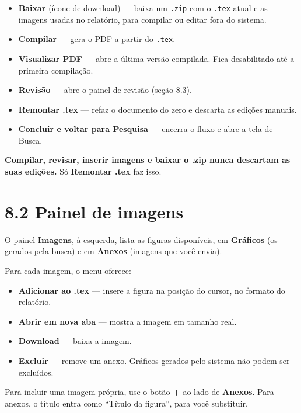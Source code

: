 \documentclass[
  brazilian,
  a4paper,12pt,oneside]{report}
\providecommand{\tightlist}{%
  \setlength{\itemsep}{0pt}\setlength{\parskip}{0pt}}
\begin{document}
\begin{itemize}
\tightlist
\item
  \textbf{Baixar} (ícone de download) --- baixa um
  \texttt{.}\allowbreak{}\texttt{zip} com o
  \texttt{.}\allowbreak{}\texttt{tex} atual e as imagens usadas no
  relatório, para compilar ou editar fora do sistema.
\item
  \textbf{Compilar} --- gera o PDF a partir do
  \texttt{.}\allowbreak{}\texttt{tex}.
\item
  \textbf{Visualizar PDF} --- abre a última versão compilada. Fica
  desabilitado até a primeira compilação.
\item
  \textbf{Revisão} --- abre o painel de revisão (seção 8.3).
\item
  \textbf{Remontar .tex} --- refaz o documento do zero e descarta as
  edições manuais.
\item
  \textbf{Concluir e voltar para Pesquisa} --- encerra o fluxo e abre a
  tela de Busca.
\end{itemize}

\textbf{Compilar, revisar, inserir imagens e baixar o .zip nunca
descartam as suas edições.} Só \textbf{Remontar .tex} faz isso.

\section{8.2 Painel de imagens}\label{painel-de-imagens}

O painel \textbf{Imagens}, à esquerda, lista as figuras disponíveis, em
\textbf{Gráficos} (os gerados pela busca) e em \textbf{Anexos} (imagens
que você envia).

Para cada imagem, o menu oferece:

\begin{itemize}
\tightlist
\item
  \textbf{Adicionar ao .tex} --- insere a figura na posição do cursor,
  no formato do relatório.
\item
  \textbf{Abrir em nova aba} --- mostra a imagem em tamanho real.
\item
  \textbf{Download} --- baixa a imagem.
\item
  \textbf{Excluir} --- remove um anexo. Gráficos gerados pelo sistema
  não podem ser excluídos.
\end{itemize}

Para incluir uma imagem própria, use o botão \textbf{+} ao lado de
\textbf{Anexos}. Para anexos, o título entra como ``Título da figura'',
para você substituir.
\end{document}
